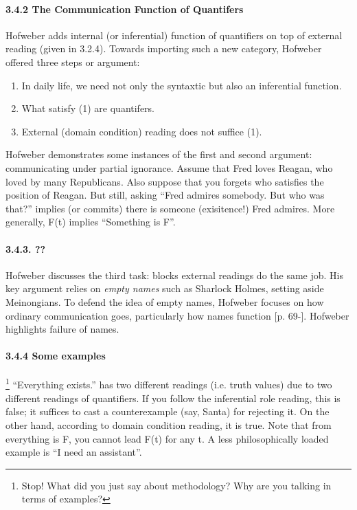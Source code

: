 \documentclass[
10pt, %
a4paper, %
twocolumn, %
landscape %
]{article}
\begin{document}
 \paragraph{3.4.2 The Communication Function of Quantifers}
 Hofweber adds internal (or inferential) function of quantifiers on top of external reading (given in 3.2.4).
 Towards importing such a new category, Hofweber offered three steps or argument:
 \begin{enumerate}
 	\item In daily life, we need not only the syntaxtic but also an inferential function.
	\item	What satisfy (1) are quantifers.
	\item	External (domain condition) reading does not suffice (1).
 \end{enumerate}

 Hofweber demonstrates some instances of the first and second argument: communicating under partial ignorance. Assume that Fred  loves Reagan, who loved by many Republicans. Also suppose that you forgets who satisfies the position of Reagan. But still, asking ``Fred admires somebody. But who was that?'' implies (or commits) there is someone (exisitence!) Fred admires.
 More generally, F(t) implies ``Something is F''.

 \paragraph{3.4.3. ??}
 Hofweber discusses the third task: blocks external readings do the same job.
 His key argument relies on \emph{empty names} such as Sharlock Holmes, setting aside Meinongians.
 To defend the idea of empty names, Hofweber focuses on how ordinary communication goes, particularly how names function [p. 69-]. Hofweber highlights failure of names.

\paragraph{3.4.4 Some examples}
\footnote{Stop! What did you just say about methodology? Why are you talking in terms of examples?}
``Everything exists.'' has two different readings (i.e. truth values) due to two different readings of quantifiers. If you follow the inferential role reading, this is false; it suffices to cast a counterexample (say, Santa) for rejecting it.
On the other hand, according to domain condition reading, it is true. Note that  from everything is F, you cannot lead F(t) for any t.
A less philosophically loaded example is ``I need an assistant''.
\end{document}
